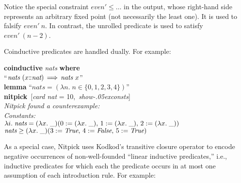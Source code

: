 \documentclass[a4paper,12pt]{article}
\def\Colon{\mathord{:\mkern-1.5mu:}}
\def\unk{{\_}}
\def\unkef{(\lambda x.\; \unk)}
\renewcommand\_{\hbox{\textunderscore\kern-.05ex}}
\begin{document}
Notice the special constraint $\textit{even}' \leq \ldots$ in the output, whose
right-hand side represents an arbitrary fixed point (not necessarily the least
one). It is used to falsify $\textit{even}'~n$. In contrast, the unrolled
predicate is used to satisfy $\textit{even}'~(n - 2)$.

Coinductive predicates are handled dually. For example:

\prew
\textbf{coinductive} \textit{nats} \textbf{where} \\
``$\textit{nats}~(x\Colon\textit{nat}) \,\Longrightarrow\, \textit{nats}~x$'' \\[2\smallskipamount]
\textbf{lemma} ``$\textit{nats} = (\lambda n.\; n \mathbin\in \{0, 1, 2, 3, 4\})$'' \\
\textbf{nitpick}~[\textit{card nat} = 10,\, \textit{show\_consts}] \\[2\smallskipamount]
\slshape Nitpick found a counterexample:
\\[2\smallskipamount]
\hbox{}\qquad Constants: \nopagebreak \\
\hbox{}\qquad\qquad $\lambda i.\; \textit{nats} = \unkef(0 := \unkef,\, 1 := \unkef,\, 2 := \unkef)$ \\
\hbox{}\qquad\qquad $\textit{nats} \geq \unkef(3 := \textit{True},\, 4 := \textit{False},\, 5 := \textit{True})$
\postw

As a special case, Nitpick uses Kodkod's transitive closure operator to encode
negative occurrences of non-well-founded ``linear inductive predicates,'' i.e.,
inductive predicates for which each the predicate occurs in at most one
assumption of each introduction rule. For example:
\end{document}
